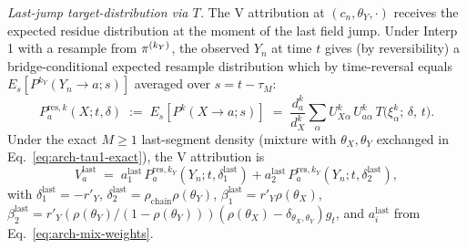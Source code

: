 \emph{Last-jump target-distribution via $T$.}
The V attribution at $(c_n, \theta_Y, \cdot)$ receives the expected
residue distribution at the moment of the last field jump. Under
Interp 1 with a resample from $\pi^{(k_Y)}$, the observed $Y_n$
at time $t$ gives (by reversibility) a bridge-conditional expected
resample distribution which by time-reversal equals
$E_s[P^{k_Y}(Y_n \to a; s)]$ averaged over $s = t - \tau_M$:
\begin{equation}
  P^{\mathrm{res}, k}_a(X; t, \delta) \;:=\; E_s[P^{k}(X \to a; s)]
  \;=\; \frac{d^k_a}{d^k_X}
    \sum_\alpha U^k_{X \alpha}\, U^k_{a\alpha}\,
      T\!\bigl(\xi^k_\alpha;\, \delta,\, t\bigr).
  \label{eq:arch-Pres}
\end{equation}
Under the exact $M \geq 1$ last-segment density (mixture with
$\theta_X, \theta_Y$ exchanged in Eq.~\ref{eq:arch-tau1-exact}), the V
attribution is
\begin{equation}
  V^{\text{last}}_a
  \;=\; a_1^{\text{last}}\, P^{\mathrm{res}, k_Y}_a(Y_n; t, \delta_1^{\text{last}})
    + a_2^{\text{last}}\, P^{\mathrm{res}, k_Y}_a(Y_n; t, \delta_2^{\text{last}}),
  \label{eq:arch-Vlast-mix}
\end{equation}
with $\delta_1^{\text{last}} = -r'_Y$, $\delta_2^{\text{last}}
= \rho_{\text{chain}} \rho(\theta_Y)$, $\beta_1^{\text{last}} = r'_Y \rho(\theta_X)$,
$\beta_2^{\text{last}} = r'_Y (\rho(\theta_Y)/(1 - \rho(\theta_Y)))
(\rho(\theta_X) - \delta_{\theta_X, \theta_Y}) g_t$, and
$a_i^{\text{last}}$ from Eq.~\ref{eq:arch-mix-weights}.

